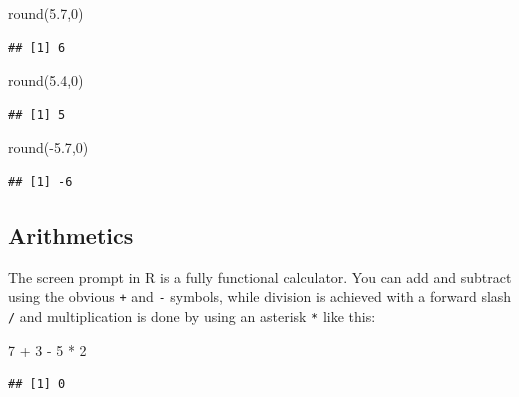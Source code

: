 \documentclass[
]{book}
\newenvironment{Shaded}{\begin{snugshade}}{\end{snugshade}}
\newcommand{\DecValTok}[1]{\textcolor[rgb]{0.00,0.00,0.81}{#1}}
\newcommand{\FloatTok}[1]{\textcolor[rgb]{0.00,0.00,0.81}{#1}}
\newcommand{\FunctionTok}[1]{\textcolor[rgb]{0.00,0.00,0.00}{#1}}
\newcommand{\NormalTok}[1]{#1}
\newcommand{\SpecialCharTok}[1]{\textcolor[rgb]{0.00,0.00,0.00}{#1}}
\theoremstyle{definition}
\theoremstyle{definition}
\theoremstyle{definition}
\theoremstyle{definition}
\theoremstyle{remark}
\begin{document}
\begin{Shaded}
\begin{Highlighting}[]
\FunctionTok{round}\NormalTok{(}\FloatTok{5.7}\NormalTok{,}\DecValTok{0}\NormalTok{)}
\end{Highlighting}
\end{Shaded}

\begin{verbatim}
## [1] 6
\end{verbatim}

\begin{Shaded}
\begin{Highlighting}[]
\FunctionTok{round}\NormalTok{(}\FloatTok{5.4}\NormalTok{,}\DecValTok{0}\NormalTok{)}
\end{Highlighting}
\end{Shaded}

\begin{verbatim}
## [1] 5
\end{verbatim}

\begin{Shaded}
\begin{Highlighting}[]
\FunctionTok{round}\NormalTok{(}\SpecialCharTok{{-}}\FloatTok{5.7}\NormalTok{,}\DecValTok{0}\NormalTok{)}
\end{Highlighting}
\end{Shaded}

\begin{verbatim}
## [1] -6
\end{verbatim}

\hypertarget{arithmetics}{%
\subsection{Arithmetics}\label{arithmetics}}

The screen prompt in R is a fully functional calculator. You can add and subtract using the obvious \texttt{+} and \texttt{-} symbols, while division is achieved with a forward slash \texttt{/} and multiplication is done by using an asterisk \texttt{*} like this:

\begin{Shaded}
\begin{Highlighting}[]
\DecValTok{7} \SpecialCharTok{+} \DecValTok{3} \SpecialCharTok{{-}} \DecValTok{5} \SpecialCharTok{*} \DecValTok{2}
\end{Highlighting}
\end{Shaded}

\begin{verbatim}
## [1] 0
\end{verbatim}
\end{document}
